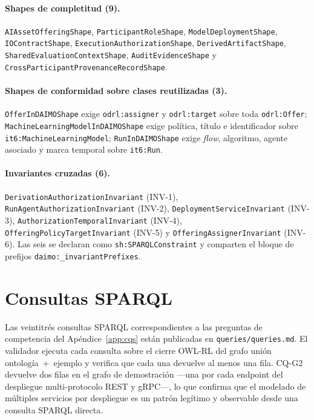 \documentclass[11pt,a4paper]{article}
\newcommand{\code}[1]{\texttt{#1}}
\begin{document}
\paragraph{Shapes de completitud (9).} \code{AIAssetOfferingShape}, \code{ParticipantRoleShape}, \code{ModelDeploymentShape}, \code{IOContractShape}, \code{ExecutionAuthorizationShape}, \code{DerivedArtifactShape}, \code{SharedEvaluationContextShape}, \code{AuditEvidenceShape} y \code{CrossParticipantProvenanceRecordShape}.

\paragraph{Shapes de conformidad sobre clases reutilizadas (3).} \code{OfferInDAIMOShape} exige \code{odrl:assigner} y \code{odrl:target} sobre toda \code{odrl:Offer}; \code{MachineLearningModelInDAIMOShape} exige política, título e identificador sobre \code{it6:MachineLearningModel}; \code{RunInDAIMOShape} exige \emph{flow}, algoritmo, agente asociado y marca temporal sobre \code{it6:Run}.

\paragraph{Invariantes cruzadas (6).} \code{DerivationAuthorizationInvariant} (INV-1), \code{RunAgentAuthorizationInvariant} (INV-2), \code{DeploymentServiceInvariant} (INV-3), \code{AuthorizationTemporalInvariant} (INV-4), \code{OfferingPolicyTargetInvariant} (INV-5) y \code{OfferingAssignerInvariant} (INV-6). Las seis se declaran como \code{sh:SPARQLConstraint} y comparten el bloque de prefijos \code{daimo:\_invariantPrefixes}.

\section{Consultas SPARQL}\label{app:sparql}

Las veintitrés consultas SPARQL correspondientes a las preguntas de competencia del Apéndice~\ref{app:cqs} están publicadas en \code{queries/queries.md}. El validador ejecuta cada consulta sobre el cierre OWL-RL del grafo unión ontología~+~ejemplo y verifica que cada una devuelve al menos una fila. CQ-G2 devuelve dos filas en el grafo de demostración ---una por cada endpoint del despliegue multi-protocolo REST y gRPC---, lo que confirma que el modelado de múltiples servicios por despliegue es un patrón legítimo y observable desde una consulta SPARQL directa.
\end{document}
